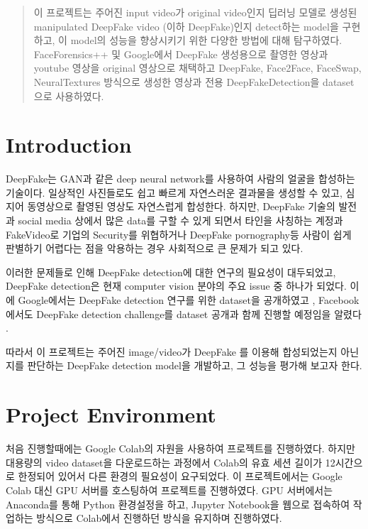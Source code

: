 \documentclass{article}
\begin{document}
	\begin{abstract}
		이 프로젝트는 주어진 input video가 original video인지 딥러닝 모델로 생성된 manipulated DeepFake video (이하 DeepFake)인지 detect하는 model을 구현하고, 이 model의 성능을 향상시키기 위한 다양한 방법에 대해 탐구하였다. FaceForensics++ 및 Google에서 DeepFake 생성용으로 촬영한 영상과 youtube 영상을 original 영상으로 채택하고 DeepFake, Face2Face, FaceSwap, NeuralTextures 방식으로 생성한 영상과 전용 DeepFakeDetection을 dataset으로 사용하였다.
	\end{abstract}
	
	\section{Introduction}
	DeepFake는 GAN과 같은 deep neural network를 사용하여 사람의 얼굴을 합성하는 기술이다. 일상적인 사진들로도 쉽고 빠르게 자연스러운 결과물을 생성할 수 있고, 심지어 동영상으로 촬영된 영상도 자연스럽게 합성한다. 하지만, DeepFake 기술의 발전과 social media 상에서 많은 data를 구할 수 있게 되면서 타인을 사칭하는 계정과 FakeVideo로 기업의 Security를 위협하거나 DeepFake pornography등 사람이 쉽게 판별하기 어렵다는 점을 악용하는 경우 사회적으로 큰 문제가 되고 있다.
	
	이러한 문제들로 인해 DeepFake detection에 대한 연구의 필요성이 대두되었고, DeepFake detection은 현재 computer vision 분야의 주요 issue 중 하나가 되었다. 이에 Google에서는 DeepFake detection 연구를 위한 dataset을 공개하였고 \cite{googleblog}, Facebook에서도 DeepFake detection challenge를 dataset 공개과 함께 진행할 예정임을 알렸다 \cite{facebookblog}.
	
	따라서 이 프로젝트는 주어진 image/video가 DeepFake 를 이용해 합성되었는지 아닌지를 판단하는 DeepFake detection model을 개발하고, 그 성능을 평가해 보고자 한다.
	
	\section{Project Environment}
	
	처음 진행할때에는 Google Colab의 자원을 사용하여 프로젝트를 진행하였다. 하지만 대용량의 video dataset을 다운로드하는 과정에서 Colab의 유효 세션 길이가 12시간으로 한정되어 있어서 다른 환경의 필요성이 요구되었다. 이 프로젝트에서는 Google Colab 대신 GPU 서버를 호스팅하여 프로젝트를 진행하였다. GPU 서버에서는 Anaconda를 통해 Python 환경설정을 하고, Jupyter Notebook을 웹으로 접속하여 작업하는 방식으로 Colab에서 진행하던 방식을 유지하며 진행하였다.
	
\end{document}

